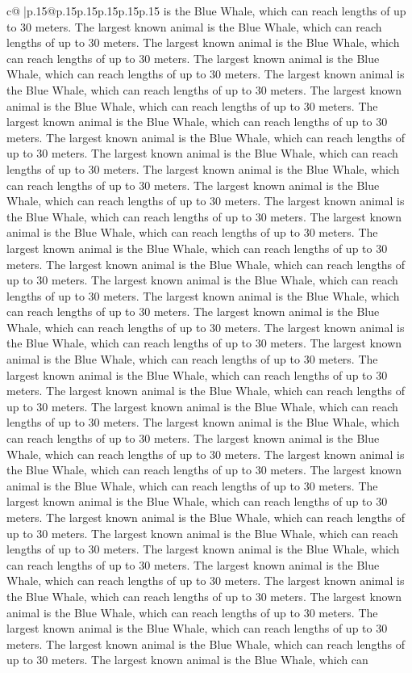 \documentclass{article}
\begin{document}
{\begin{supertabular}{c@{$\;$}|p{.15\linewidth}@{}p{.15\linewidth}p{.15\linewidth}p{.15\linewidth}p{.15\linewidth}p{.15\linewidth}}
{{{is the Blue Whale, which can reach lengths of up to 30 meters. The largest known animal is the Blue Whale, which can reach lengths of up to 30 meters. The largest known animal is the Blue Whale, which can reach lengths of up to 30 meters. The largest known animal is the Blue Whale, which can reach lengths of up to 30 meters. The largest known animal is the Blue Whale, which can reach lengths of up to 30 meters. The largest known animal is the Blue Whale, which can reach lengths of up to 30 meters. The largest known animal is the Blue Whale, which can reach lengths of up to 30 meters. The largest known animal is the Blue Whale, which can reach lengths of up to 30 meters. The largest known animal is the Blue Whale, which can reach lengths of up to 30 meters. The largest known animal is the Blue Whale, which can reach lengths of up to 30 meters. The largest known animal is the Blue Whale, which can reach lengths of up to 30 meters. The largest known animal is the Blue Whale, which can reach lengths of up to 30 meters. The largest known animal is the Blue Whale, which can reach lengths of up to 30 meters. The largest known animal is the Blue Whale, which can reach lengths of up to 30 meters. The largest known animal is the Blue Whale, which can reach lengths of up to 30 meters. The largest known animal is the Blue Whale, which can reach lengths of up to 30 meters. The largest known animal is the Blue Whale, which can reach lengths of up to 30 meters. The largest known animal is the Blue Whale, which can reach lengths of up to 30 meters. The largest known animal is the Blue Whale, which can reach lengths of up to 30 meters. The largest known animal is the Blue Whale, which can reach lengths of up to 30 meters. The largest known animal is the Blue Whale, which can reach lengths of up to 30 meters. The largest known animal is the Blue Whale, which can reach lengths of up to 30 meters. The largest known animal is the Blue Whale, which can reach lengths of up to 30 meters. The largest known animal is the Blue Whale, which can reach lengths of up to 30 meters. The largest known animal is the Blue Whale, which can reach lengths of up to 30 meters. The largest known animal is the Blue Whale, which can reach lengths of up to 30 meters. The largest known animal is the Blue Whale, which can reach lengths of up to 30 meters. The largest known animal is the Blue Whale, which can reach lengths of up to 30 meters. The largest known animal is the Blue Whale, which can reach lengths of up to 30 meters. The largest known animal is the Blue Whale, which can reach lengths of up to 30 meters. The largest known animal is the Blue Whale, which can reach lengths of up to 30 meters. The largest known animal is the Blue Whale, which can reach lengths of up to 30 meters. The largest known animal is the Blue Whale, which can reach lengths of up to 30 meters. The largest known animal is the Blue Whale, which can reach lengths of up to 30 meters. The largest known animal is the Blue Whale, which can reach lengths of up to 30 meters. The largest known animal is the Blue Whale, which can reach lengths of up to 30 meters. The largest known animal is the Blue Whale, which can }}}
\end{supertabular}}
\end{document}
